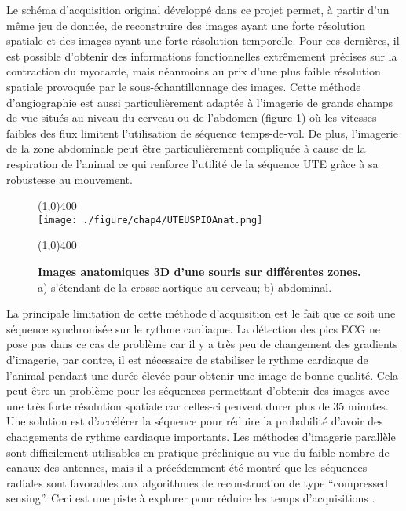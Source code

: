 Le schéma d’acquisition original développé dans ce projet permet, à partir d’un même jeu de donnée, de reconstruire des images ayant une forte résolution spatiale et des images ayant une forte résolution temporelle. Pour ces dernières, il est possible d’obtenir des informations fonctionnelles extrêmement précises sur la contraction du myocarde, mais néanmoins au prix d’une plus faible résolution spatiale provoquée par le sous-échantillonnage des images. Cette méthode d'angiographie est aussi particulièrement adaptée à l'imagerie de grands champs de vue situés au niveau du cerveau ou de l'abdomen (figure \ref{fig:UTEUSPIOAnat}) où les vitesses faibles des flux limitent l'utilisation de séquence temps-de-vol. De plus, l'imagerie de la zone abdominale peut être particulièrement compliquée à cause de la respiration de l'animal ce qui renforce l'utilité de la séquence UTE grâce à sa robustesse au mouvement. 

\begin{figure}[H]
\centering
\line(1,0){400} \\
\texttt{[image: ./figure/chap4/UTEUSPIOAnat.png]}
\caption[Images anatomiques 3D d'une souris sur différentes zones.]{\label{fig:UTEUSPIOAnat} \textbf{Images anatomiques 3D d'une souris sur différentes zones.} a) s'étendant de la crosse aortique au cerveau; b) abdominal.}
\line(1,0){400} \\ 
\end{figure}

La principale limitation de cette méthode d’acquisition est le fait que ce soit une séquence synchronisée sur le rythme cardiaque. La détection des pics ECG ne pose pas dans ce cas de problème car il y a très peu de changement des gradients d’imagerie, par contre, il est nécessaire de stabiliser le rythme cardiaque de l’animal pendant une durée élevée pour obtenir une image de bonne qualité. Cela peut être un problème pour les séquences permettant d’obtenir des images avec une très forte résolution spatiale car celles-ci peuvent durer plus de 35 minutes. Une solution est d’accélérer la séquence pour réduire la probabilité d’avoir des changements de rythme cardiaque importants. Les méthodes d’imagerie parallèle sont difficilement utilisables en pratique préclinique au vue du faible nombre de canaux des antennes, mais il a précédemment été montré que les séquences radiales sont favorables aux algorithmes de reconstruction de type “compressed sensing”. Ceci est une piste à explorer pour réduire les temps d'acquisitions \cite{Nam:2013nx}.
 
